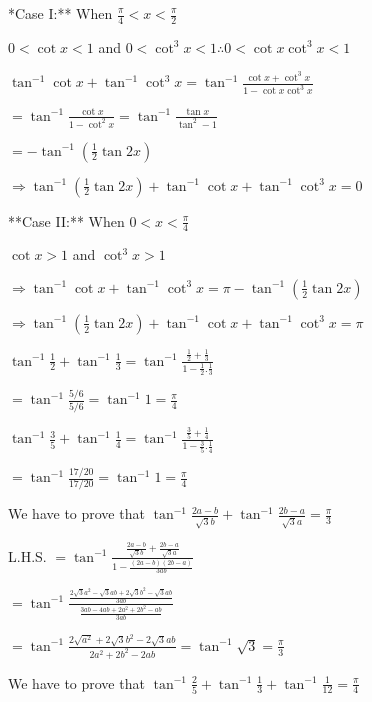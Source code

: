 \item **Case I:** When $\frac{\pi}{4}<x<\frac{\pi}{2}$

  $0<\cot x< 1$ and $0<\cot^3x<1 \therefore 0<\cot x\cot^3x<1$

  $\tan^{-1}\cot x + \tan^{-1}\cot^3x =\tan^{-1}\frac{\cot x + \cot^3x}{1 - \cot x\cot^3x}$

  $=\tan^{-1}\frac{\cot x}{1 - \cot^2x} = \tan^{-1}\frac{\tan x}{\tan^2 - 1}$

  $= -\tan^{-1}\left(\frac{1}{2}\tan 2x\right)$

  $\Rightarrow \tan^{-1}\left(\frac{1}{2}\tan 2x\right) + \tan^{-1}\cot x + \tan^{-1}\cot^3x = 0$

  **Case II:** When $0<x<\frac{\pi}{4}$

  $\cot x> 1$ and $\cot^3x > 1$

  $\Rightarrow \tan^{-1}\cot x + \tan^{-1}\cot^3x = \pi - \tan^{-1}\left(\frac{1}{2}\tan2x\right)$

  $\Rightarrow \tan^{-1}\left(\frac{1}{2}\tan 2x\right) + \tan^{-1}\cot x + \tan^{-1}\cot^3x = \pi$

\item $\tan^{-1}\frac{1}{2} + \tan^{-1}\frac{1}{3} = \tan^{-1}\frac{\frac{1}{2} + \frac{1}{3}}{1 - \frac{1}{2}.\frac{1}{3}}$

  $= \tan^{-1}\frac{5/6}{5/6} = \tan^{-1}1 = \frac{\pi}{4}$

  $\tan^{-1}\frac{3}{5} + \tan^{-1}\frac{1}{4} = \tan^{-1}\frac{\frac{3}{5} + \frac{1}{4}}{1 - \frac{3}{5}.\frac{1}{4}}$

  $=\tan^{-1}\frac{17/20}{17/20} = \tan^{-1}1 = \frac{\pi}{4}$

\item We have to prove that $\tan^{-1}\frac{2a - b}{\sqrt{3}b} + \tan^{-1}\frac{2b - a}{\sqrt{3}a} = \frac{\pi}{3}$

  L.H.S. $= \tan^{-1}\frac{\frac{2a - b}{\sqrt{3}b} + \frac{2b - a}{\sqrt{3}a}}{1 - \frac{(2a - b)(2b - a)}{3ab}}$

  $= \tan^{-1}\frac{\frac{2\sqrt{3}a^2 - \sqrt{3}ab + 2\sqrt{3}b^2 -\sqrt{3}ab}{3ab}}{\frac{3ab - 4ab + 2a^2 +
      2b^2 - ab}{3ab}}$

  $= \tan^{-1}\frac{2\sqrt{a^2} + 2\sqrt{3}b^2 - 2\sqrt{3}ab}{2a^2 + 2b^2 - 2ab} = \tan^{-1}\sqrt{3} = \frac{\pi}{3}$

\item We have to prove that $\tan^{-1}\frac{2}{5} + \tan^{-1}\frac{1}{3} + \tan^{-1}\frac{1}{12} = \frac{\pi}{4}$

